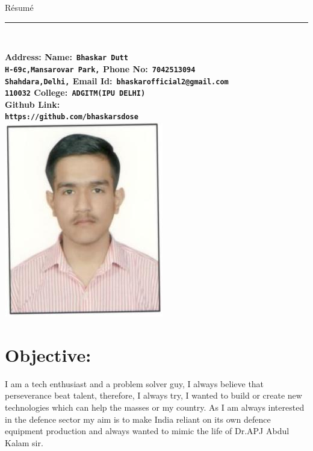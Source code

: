 \documentclass[10pt]{report}
\begin{document}
	
{\huge\hspace{210pt}R\'{e}sum\'{e}}
\\{\noindent\rule{18cm}{0.8pt}\\[4pt]}
\bf Address: \hspace{259pt}\bf Name:\verb| Bhaskar Dutt|
\\
\verb"H-69c,Mansarovar Park,"  \hspace{188pt}\bf Phone No:\verb" 7042513094"
\\{\verb"Shahdara,Delhi,"}   \hspace{225pt}\bf Email Id:\verb" bhaskarofficial2@gmail.com"
\\{\verb"110032"}    \hspace{272pt}\bf College:\verb" ADGITM(IPU DELHI)"
\\\hspace{250pt}\bf Github Link:\\\verb|https://github.com/bhaskarsdose| \\[1pt]
	                  

{\hspace{330pt}\includegraphics[scale =0.5]{bhaskar}\\[3pt]} %
\section*{Objective:} %
\normalfont I am a tech enthusiast and a problem solver guy, I always believe that perseverance beat talent, therefore, I always try, I wanted to build or create new technologies which can help the masses or my country. As I am always interested in the defence sector my aim is to make India reliant on its own defence equipment production and always wanted to mimic the life of Dr.APJ Abdul Kalam sir.
\end{document}
